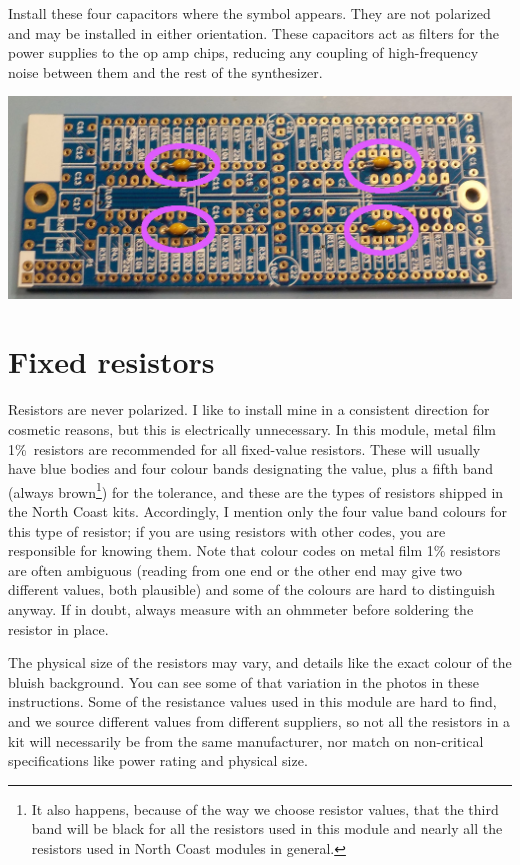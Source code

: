 Install these four capacitors where the symbol appears.  They are not
polarized and may be installed in either orientation.  These capacitors act
as filters for the power supplies to the op amp chips, reducing any coupling
of high-frequency noise between them and the rest of the synthesizer.

\noindent\includegraphics[width=\linewidth]{cap-decoup.jpg}

\section{Fixed resistors}

Resistors are never polarized.  I like to install mine in a consistent
direction for cosmetic reasons, but this is electrically unnecessary.  In
this module, metal film 1\%\ resistors are recommended for all fixed-value
resistors.  These will usually have blue bodies and four colour bands
designating the value, plus a fifth band (always brown\footnote{It also
happens, because of the way we choose resistor values, that the third band
will be black for all the resistors used in this module and nearly all the
resistors used in North Coast modules in general.}) for the tolerance,
and these are the types of resistors shipped in the North Coast kits.
Accordingly, I mention only the four value band colours for this type of
resistor; if you are using resistors with other codes, you are responsible
for knowing them.  Note that colour codes on metal film 1\% resistors are
often ambiguous (reading from one end or the other end may give two
different values, both plausible) and some of the colours are hard to
distinguish anyway.  If in doubt, always measure with an ohmmeter before
soldering the resistor in place.

The physical size of the resistors may vary, and details like the exact
colour of the bluish background.  You can see some of that variation in the
photos in these instructions.  Some of the resistance values used in this
module are hard to find, and we source different values from different
suppliers, so not all the resistors in a kit will necessarily be from the
same manufacturer, nor match on non-critical specifications like power
rating and physical size.

